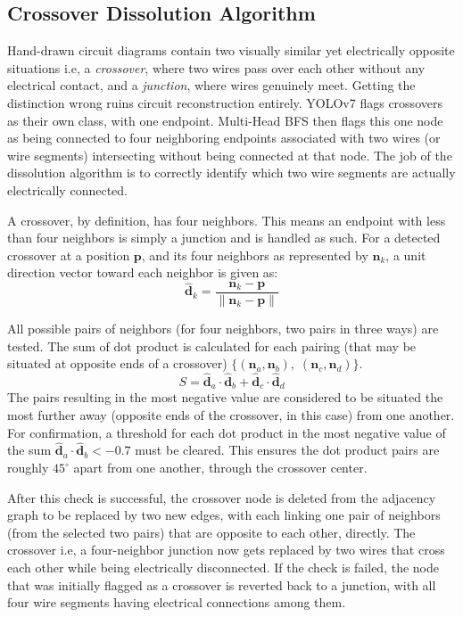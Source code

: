 \subsection{Crossover Dissolution Algorithm}

Hand-drawn circuit diagrams contain two visually similar yet electrically opposite situations i.e, a \textit{crossover}, where two wires pass over each other without any electrical contact, and a \textit{junction}, where wires genuinely meet. Getting the distinction wrong ruins circuit reconstruction entirely. YOLOv7 flags crossovers as their own class, with one endpoint. Multi-Head BFS then flags this one node as being connected to four neighboring endpoints associated with two wires (or wire segments) intersecting without being connected at that node. The job of the dissolution algorithm is to correctly identify which two wire segments are actually electrically connected.

A crossover, by definition, has four neighbors. This means an endpoint with less than four neighbors is simply a junction and is handled as such. For a detected crossover at a position $\mathbf{p}$, and its four neighbors as represented by $\mathbf{n}_k$, a unit direction vector toward each neighbor is given as:
\begin{equation}
    \hat{\mathbf{d}}_k = \frac{\mathbf{n}_k - \mathbf{p}}{\|\mathbf{n}_k - \mathbf{p}\|}
\end{equation}

All possible pairs of neighbors (for four neighbors, two pairs in three ways) are tested. The sum of dot product is calculated for each pairing (that may be situated at opposite ends of a crossover) $\{(\mathbf{n}_a, \mathbf{n}_b),\; (\mathbf{n}_c, \mathbf{n}_d)\}$.
\begin{equation}
    S = \hat{\mathbf{d}}_a \cdot \hat{\mathbf{d}}_b + \hat{\mathbf{d}}_c \cdot \hat{\mathbf{d}}_d
\end{equation}
The pairs resulting in the most negative value are considered to be situated the most further away (opposite ends of the crossover, in this case) from one another. For confirmation, a threshold for each dot product in the most negative value of the sum $\hat{\mathbf{d}}_a \cdot \hat{\mathbf{d}}_b < -0.7$ must be cleared. This ensures the dot product pairs are roughly $45^\circ$ apart from one another, through the crossover center.

After this check is successful, the crossover node is deleted from the adjacency graph to be replaced by two new edges, with each linking one pair of neighbors (from the selected two pairs) that are opposite to each other, directly. The crossover i.e, a four-neighbor junction now gets replaced by two wires that cross each other while being electrically disconnected. If the check is failed, the node that was initially flagged as a crossover is reverted back to a junction, with all four wire segments having electrical connections among them.

